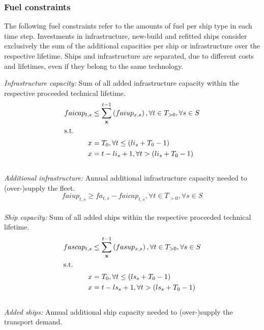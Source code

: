 \documentclass[article]{elsarticle}
\begin{document}
\subsubsection{Fuel constraints}
The following fuel constraints refer to the amounts of fuel per ship type in each time step. Investments in infrastructure, new-build and refitted ships consider exclusively the sum of the additional capacities per ship or infrastructure over the respective lifetime. Ships and infrastructure are separated, due to different costs and lifetimes, even if they belong to the same technology.\\\par\noindent
\textit{Infrastructure capacity: }Sum of all added infrastructure capacity within the respective proceeded technical lifetime.
\begin{subequations}
    \begin{align}
        faicap_{t,s} &\leq \sum_{\textbf{x}}^{t-1} \left( faiup_{x,s} \right), \forall t \in T_{>0}, \forall s \in S\label{eq:faicap}\\
        \intertext{s.t.}
        x &= T_0, \forall t \leq \left(li_{s} + T_0 - 1\right)\\
        x &= t - li_{s} + 1, \forall t > \left(li_{s} + T_0 - 1\right)
    \end{align}
\end{subequations}\\
\textit{Additional infrastructure: }Annual additional infrastructure capacity needed to (over-)supply the fleet.
\begin{equation}
    faiup_{t,s} \geq fa_{t,s} - faicap_{t,s}, \forall t \in T_{>0}, \forall s \in S\label{eq:faiup}
\end{equation}\\
\textit{Ship capacity: }Sum of all added ships within the respective proceeded technical lifetime.
\begin{subequations}
    \begin{align}
        fascap_{t,s} &\leq \sum_{\textbf{x}}^{t-1} \left(fasup_{x,s} \right), \forall t \in T_{>0}, \forall s \in S\label{eq:fascap}\\
        \intertext{s.t.}
        x &= T_0, \forall t \leq \left(ls_{s} + T_0 - 1\right)\\
        x &= t - ls_{s} + 1, \forall t > \left(ls_{s} + T_0 - 1\right)
    \end{align}
\end{subequations}\\
\textit{Added ships: }Annual additional ship capacity needed to (over-)supply the transport demand.
\end{document}

